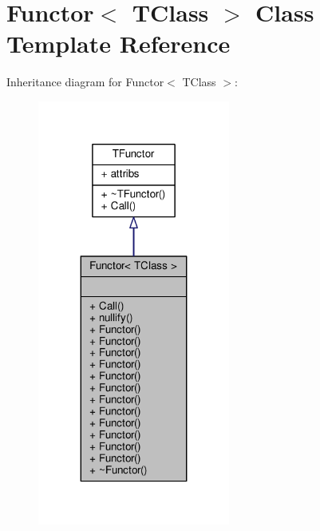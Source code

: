 \hypertarget{classFunctor}{}\section{Functor$<$ T\+Class $>$ Class Template Reference}
\label{classFunctor}


Inheritance diagram for Functor$<$ T\+Class $>$\+:
\nopagebreak
\begin{figure}[H]
\begin{center}
\leavevmode
\includegraphics[width=179pt]{d9/dd3/classFunctor__inherit__graph}
\end{center}
\end{figure}


